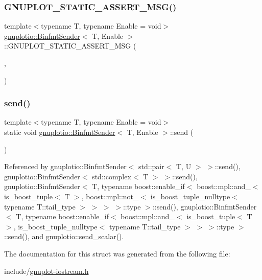 \subsubsection{\texorpdfstring{G\+N\+U\+P\+L\+O\+T\+\_\+\+S\+T\+A\+T\+I\+C\+\_\+\+A\+S\+S\+E\+R\+T\+\_\+\+M\+S\+G()}{GNUPLOT\_STATIC\_ASSERT\_MSG()}}
{\footnotesize\ttfamily template$<$typename T, typename Enable = void$>$ \\
\hyperlink{structgnuplotio_1_1_binfmt_sender}{gnuplotio\+::\+Binfmt\+Sender}$<$ T, Enable $>$\+::G\+N\+U\+P\+L\+O\+T\+\_\+\+S\+T\+A\+T\+I\+C\+\_\+\+A\+S\+S\+E\+R\+T\+\_\+\+M\+SG (\begin{DoxyParamCaption}\item[{(sizeof(T)==0)}]{,  }\item[{\char`\"{}Binfmt\+Sender$<$ T, Enable $>$ class not specialized for this type\char`\"{}}]{ }\end{DoxyParamCaption})}

\mbox{\label{structgnuplotio_1_1_binfmt_sender_a762010e3172c02e981252f93185b29c8}} 
\subsubsection{\texorpdfstring{send()}{send()}}
{\footnotesize\ttfamily template$<$typename T, typename Enable = void$>$ \\
static void \hyperlink{structgnuplotio_1_1_binfmt_sender}{gnuplotio\+::\+Binfmt\+Sender}$<$ T, Enable $>$\+::send (\begin{DoxyParamCaption}\item[{std\+::ostream \&}]{ }\end{DoxyParamCaption})\hspace{0.3cm}{\ttfamily [static]}}



Referenced by gnuplotio\+::\+Binfmt\+Sender$<$ std\+::pair$<$ T, U $>$ $>$\+::send(), gnuplotio\+::\+Binfmt\+Sender$<$ std\+::complex$<$ T $>$ $>$\+::send(), gnuplotio\+::\+Binfmt\+Sender$<$ T, typename boost\+::enable\+\_\+if$<$ boost\+::mpl\+::and\+\_\+$<$ is\+\_\+boost\+\_\+tuple$<$ T $>$, boost\+::mpl\+::not\+\_\+$<$ is\+\_\+boost\+\_\+tuple\+\_\+nulltype$<$ typename T\+::tail\+\_\+type $>$ $>$ $>$ $>$\+::type $>$\+::send(), gnuplotio\+::\+Binfmt\+Sender$<$ T, typename boost\+::enable\+\_\+if$<$ boost\+::mpl\+::and\+\_\+$<$ is\+\_\+boost\+\_\+tuple$<$ T $>$, is\+\_\+boost\+\_\+tuple\+\_\+nulltype$<$ typename T\+::tail\+\_\+type $>$ $>$ $>$\+::type $>$\+::send(), and gnuplotio\+::send\+\_\+scalar().



The documentation for this struct was generated from the following file\+:\begin{DoxyCompactItemize}
\item 
include/\hyperlink{gnuplot-iostream_8h}{gnuplot-\/iostream.\+h}\end{DoxyCompactItemize}
